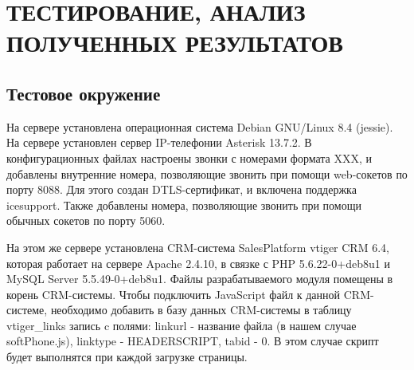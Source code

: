 \chapter{ТЕСТИРОВАНИЕ, АНАЛИЗ ПОЛУЧЕННЫХ РЕЗУЛЬТАТОВ}

\section{Тестовое окружение}

На сервере установлена операционная система Debian GNU/Linux 8.4 (jessie). На сервере установлен сервер IP-телефонии Asterisk 13.7.2. В конфигурационных файлах настроены звонки с номерами формата XXX, и добавлены внутренние номера, позволяющие звонить при помощи web-сокетов по порту 8088. Для этого создан DTLS-сертификат, и включена поддержка icesupport.\cite{asterisk} Также добавлены номера, позволяющие звонить при помощи обычных сокетов по порту 5060.

На этом же сервере установлена CRM-система SalesPlatform vtiger CRM 6.4, которая работает на сервере Apache 2.4.10, в связке с PHP 5.6.22-0+deb8u1 и MySQL Server 5.5.49-0+deb8u1. Файлы разрабатываемого модуля помещены в корень CRM-системы. Чтобы подключить JavaScript файл к данной CRM-системе, необходимо добавить в базу данных CRM-системы в таблицу vtiger\_links запись c полями: linkurl - название файла (в нашем случае softPhone.js), linktype - HEADERSCRIPT, tabid - 0.\cite{vtiger_db} В этом случае скрипт будет выполнятся при каждой загрузке страницы.

